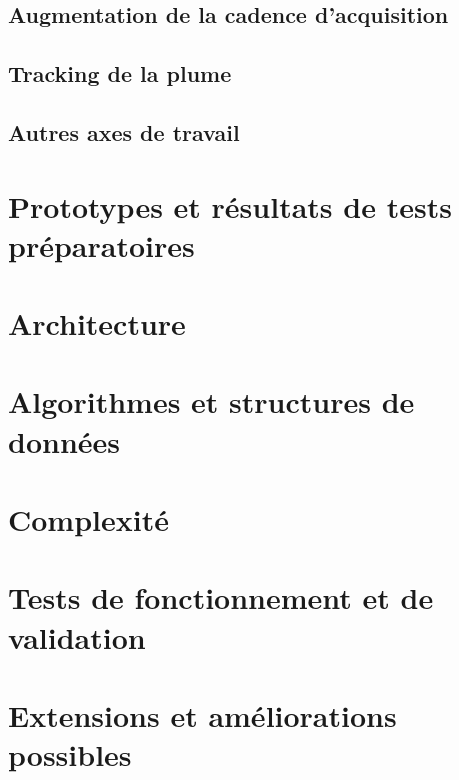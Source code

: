 \documentclass{article}
\begin{document}
\subsection{Augmentation de la cadence d'acquisition}



\subsection{Tracking de la plume}



\subsection{Autres axes de travail}



\section{Prototypes et résultats de tests préparatoires}



\section{Architecture}



\section{Algorithmes et structures de données}



\section{Complexité}



\section{Tests de fonctionnement et de validation}



\section{Extensions et améliorations possibles}
\end{document}
